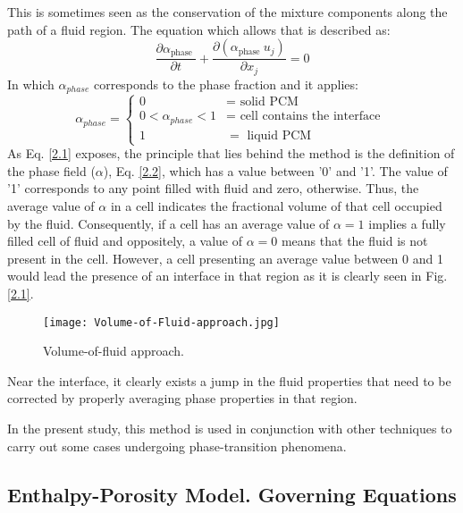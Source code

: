 \noindent This is sometimes seen as the conservation of the mixture components along the path of a fluid region. The equation which allows that is described as:
\begin{equation}
	\frac{\partial \alpha_{\text {phase }}}{\partial t}+\frac{\partial\left(\alpha_{\text {phase }} u_{j}\right)}{\partial x_{j}}=0
	\label{2.1}
\end{equation}
In which $\alpha_{phase}$ corresponds to the phase fraction and it applies:
\begin{equation}
	\alpha_{phase}= \begin{cases}
		0 & =\text { solid PCM } \\ 0<\alpha_{phase}<1 & =\text { cell contains the interface } \\ 1 & =\text { liquid } \mathrm{PCM}
	\end{cases}
	\label{2.2}
\end{equation}
\clearpage
\noindent As Eq. \ref{2.1} exposes, the principle that lies behind the method is the definition of the phase field ($\alpha$), Eq. \ref{2.2}, which has a value between '0' and '1'. The value of '1' corresponds to any point filled with fluid and zero, otherwise. Thus, the average value of $\alpha$	in a cell indicates the fractional volume of that cell occupied by the fluid. Consequently, if a cell has an average value of $\alpha=1$ implies a fully filled cell of fluid and oppositely, a value of $\alpha=0$ means that the fluid is not present in the cell. However, a cell presenting an average value between 0 and 1 would lead the presence of an interface in that region as it is clearly seen in Fig. \ref{2.1}.
\begin{figure}[h!]
	\centering
	\texttt{[image: Volume-of-Fluid-approach.jpg]}	
	\label{2.1fig}
	\caption{Volume-of-fluid approach.}
\end{figure} 

\noindent Near the interface, it clearly exists a jump in the fluid properties that need to be corrected by properly averaging phase properties in that region.

\noindent In the present study, this method is used in conjunction with other techniques to carry out some cases undergoing phase-transition phenomena.

\subsection{Enthalpy-Porosity Model. Governing Equations}

